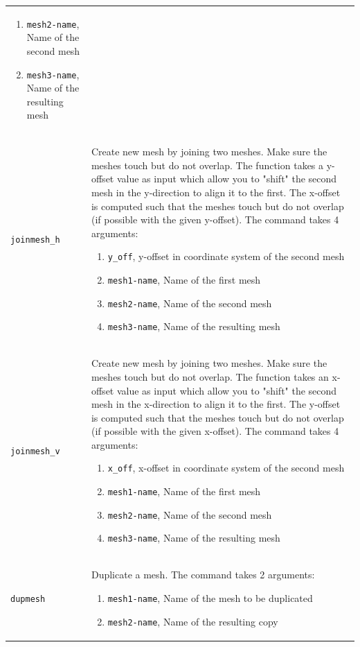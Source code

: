 \documentclass[noshowpacs,preprintnumbers,amsmath,amssymb, letter]{revtex4}
\begin{document}
\begin{longtable}{p{}p{}}
\begin{enumerate}
\item \texttt{mesh2-name}, Name of the second mesh
\item \texttt{mesh3-name}, Name of the resulting mesh
\end{enumerate}\\
\texttt{joinmesh\_h}	& Create new mesh by joining two meshes. Make sure the meshes touch but do not overlap. The function takes a y-offset value as input which allow you to "shift" the second mesh in the y-direction to align it to the first. The x-offset is computed such that the meshes touch but do not overlap (if possible with the given y-offset). The command takes 4 arguments:
\begin{enumerate}
\item \texttt{y\_off}, y-offset in coordinate system of the second mesh 
\item \texttt{mesh1-name}, Name of the first mesh
\item \texttt{mesh2-name}, Name of the second mesh
\item \texttt{mesh3-name}, Name of the resulting mesh
\end{enumerate}\\
\texttt{joinmesh\_v}	& Create new mesh by joining two meshes. Make sure the meshes touch but do not overlap. The function takes an x-offset value as input which allow you to "shift" the second mesh in the x-direction to align it to the first. The y-offset is computed such that the meshes touch but do not overlap (if possible with the given x-offset). The command takes 4 arguments:
\begin{enumerate}
\item \texttt{x\_off}, x-offset in coordinate system of the second mesh 
\item \texttt{mesh1-name}, Name of the first mesh
\item \texttt{mesh2-name}, Name of the second mesh
\item \texttt{mesh3-name}, Name of the resulting mesh
\end{enumerate}\\
\texttt{dupmesh}	& Duplicate a mesh. The command takes 2 arguments:
\begin{enumerate}
\item \texttt{mesh1-name}, Name of the mesh to be duplicated
\item \texttt{mesh2-name}, Name of the resulting copy

\end{enumerate}
\end{longtable}
\end{document}
